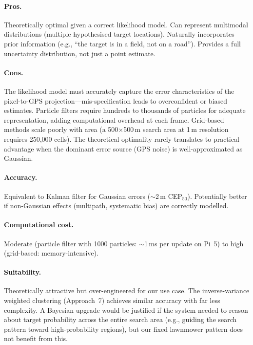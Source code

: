 \paragraph{Pros.}
Theoretically optimal given a correct likelihood model.  Can represent multimodal distributions (multiple hypothesised target locations).  Naturally incorporates prior information (e.g., ``the target is in a field, not on a road'').  Provides a full uncertainty distribution, not just a point estimate.

\paragraph{Cons.}
The likelihood model must accurately capture the error characteristics of the pixel-to-GPS projection---mis-specification leads to overconfident or biased estimates.  Particle filters require hundreds to thousands of particles for adequate representation, adding computational overhead at each frame.  Grid-based methods scale poorly with area (a 500$\times$500\,m search area at 1\,m resolution requires 250,000 cells).  The theoretical optimality rarely translates to practical advantage when the dominant error source (GPS noise) is well-approximated as Gaussian.

\paragraph{Accuracy.}  Equivalent to Kalman filter for Gaussian errors ($\sim$2\,m CEP$_{50}$).  Potentially better if non-Gaussian effects (multipath, systematic bias) are correctly modelled.

\paragraph{Computational cost.}  Moderate (particle filter with 1000 particles: $\sim$1\,ms per update on Pi~5) to high (grid-based: memory-intensive).

\paragraph{Suitability.}  Theoretically attractive but over-engineered for our use case.  The inverse-variance weighted clustering (Approach~7) achieves similar accuracy with far less complexity.  A Bayesian upgrade would be justified if the system needed to reason about target probability across the entire search area (e.g., guiding the search pattern toward high-probability regions), but our fixed lawnmower pattern does not benefit from this.


